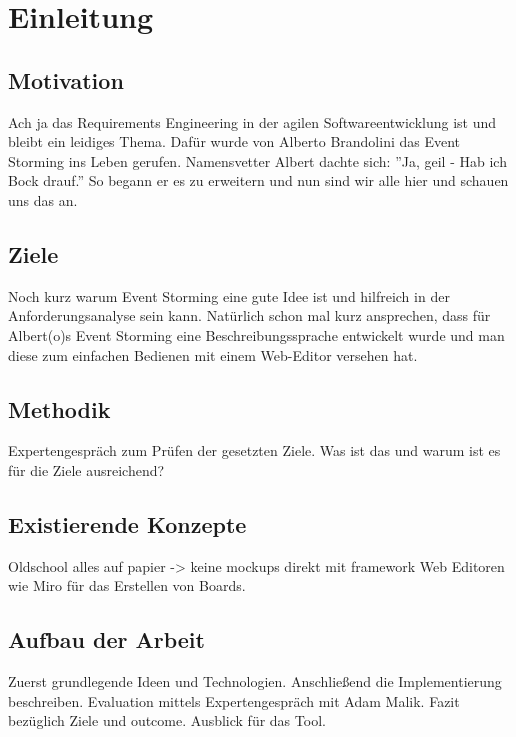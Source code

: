 \chapter{Einleitung}\label{ch:einleitung}
\todo

\section{Motivation}\label{sec:motivation}
\todo
Ach ja das Requirements Engineering in der agilen Softwareentwicklung ist
und bleibt ein leidiges Thema.
Dafür wurde von Alberto Brandolini das Event Storming ins Leben gerufen.
Namensvetter Albert dachte sich: ''Ja, geil - Hab ich Bock drauf.''
So begann er es zu erweitern und nun sind wir alle hier und schauen uns das an.

\section{Ziele}\label{sec:ziele}
\todo
Noch kurz warum Event Storming eine gute Idee ist und hilfreich in der
Anforderungsanalyse sein kann.
Natürlich schon mal kurz ansprechen, dass für Albert(o)s Event Storming eine
Beschreibungssprache entwickelt wurde und man diese zum einfachen Bedienen
mit einem Web-Editor versehen hat.

\section{Methodik}\label{sec:methodik}
\todo
Expertengespräch zum Prüfen der gesetzten Ziele.
Was ist das und warum ist es für die Ziele ausreichend?

\section{Existierende Konzepte}\label{sec:existierende-konzepte}
\todo
Oldschool alles auf papier -> keine mockups direkt mit framework
Web Editoren wie Miro für das Erstellen von Boards.

\section{Aufbau der Arbeit}\label{sec:aufbau-der-arbeit}
\todo
Zuerst grundlegende Ideen und Technologien.
Anschließend die Implementierung beschreiben.
Evaluation mittels Expertengespräch mit Adam Malik.
Fazit bezüglich Ziele und outcome.
Ausblick für das Tool.
